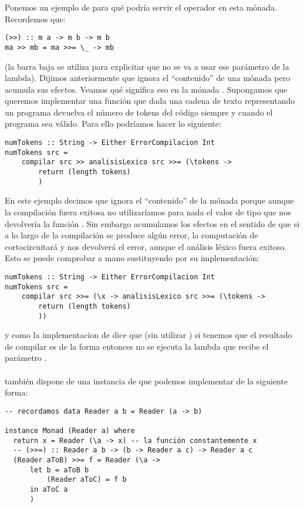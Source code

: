 Ponemos un ejemplo de para qué podría servir el operador
\cod{>{}>} en esta mónada. Recordemos que:
\begin{verbatim}
(>>) :: m a -> m b -> m b
ma >> mb = ma >>= \_ -> mb
\end{verbatim}
(la barra baja se utiliza para explicitar que no se va a usar
ese parámetro de la lambda). Dijimos anteriormente
que \cod{>{}>} ignora el ``contenido'' de una mónada pero
acumula sus efectos. Veamos qué significa eso en la mónada
. Supongamos que queremos implementar una función
que dada una cadena de texto representando un programa devuelva
el número de tokens del código siempre y cuando el programa sea válido.
Para ello podríamos hacer lo siguiente:
\begin{verbatim}
numTokens :: String -> Either ErrorCompilacion Int
numTokens src =
    compilar src >> analisisLexico src >>= (\tokens ->
        return (length tokens)
        )
\end{verbatim}
En este ejemplo decimos que \cod{>{}>} ignora el ``contenido'' de
la mónada porque aunque la compilación fuera exitosa no utilizaríamos
para nada el valor de tipo  que nos devolvería la
función . Sin embargo acumulamos
los efectos en el sentido de que si a lo largo de la compilación se
produce algún error, la computación de  cortocircuitará
y nos devolverá el error, aunque el análisis léxico fuera exitoso.
Esto se puede comprobar a mano sustituyendo \cod{>{}>} por su
implementación:
\begin{verbatim}
numTokens :: String -> Either ErrorCompilacion Int
numTokens src =
    compilar src >>= (\x -> analisisLexico src >>= (\tokens ->
        return (length tokens)
        ))
\end{verbatim}
y como la implementacion de \cod{>{}>=} dice que
 (sin utilizar
) si tenemos que el resultado
de compilar es de la forma  entonces
no se ejecuta la lambda que recibe el parámetro .

\paragraph{}
 también dispone de una instancia de 
que podemos implementar de la siguiente forma:
\begin{verbatim}
-- recordamos data Reader a b = Reader (a -> b)

instance Monad (Reader a) where
  return x = Reader (\a -> x) -- la función constantemente x
  -- (>>=) :: Reader a b -> (b -> Reader a c) -> Reader a c
  (Reader aToB) >>= f = Reader (\a ->
      let b = aToB b
          (Reader aToC) = f b
      in aToC a
      )
\end{verbatim}

